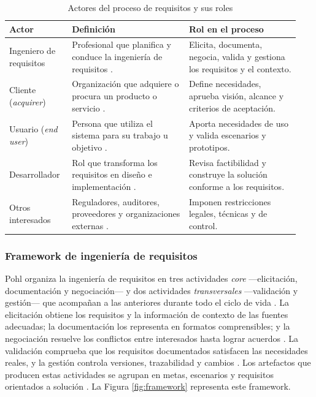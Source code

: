 \documentclass[onecolumn,12pt]{IEEEtran}
\begin{document}
\begin{table}[htbp]
\caption{Actores del proceso de requisitos y sus roles}
\label{tab:actores}
\centering
\footnotesize
\begin{tabular}{@{}p{0.20\linewidth}p{0.38\linewidth}p{0.36\linewidth}@{}}
\toprule
\textbf{Actor} & \textbf{Definici\'on} & \textbf{Rol en el proceso}\\
\midrule
Ingeniero de requisitos & Profesional que planifica y conduce la ingenier\'ia de requisitos \cite{pohl2025,ireb2023}. & Elicita, documenta, negocia, valida y gestiona los requisitos y el contexto.\\
Cliente (\emph{acquirer}) & Organizaci\'on que adquiere o procura un producto o servicio \cite{iso29148}. & Define necesidades, aprueba visi\'on, alcance y criterios de aceptaci\'on.\\
Usuario (\emph{end user}) & Persona que utiliza el sistema para su trabajo u objetivo \cite{iso29148}. & Aporta necesidades de uso y valida escenarios y prototipos.\\
Desarrollador & Rol que transforma los requisitos en dise\~no e implementaci\'on \cite{iso29148,pohl2025}. & Revisa factibilidad y construye la soluci\'on conforme a los requisitos.\\
Otros interesados & Reguladores, auditores, proveedores y organizaciones externas \cite{iso29148,pmbok7}. & Imponen restricciones legales, t\'ecnicas y de control.\\
\bottomrule
\end{tabular}
\end{table}

\subsubsection{Framework de ingenier\'ia de requisitos}
Pohl organiza la ingenier\'ia de requisitos en tres actividades \emph{core} ---elicitaci\'on, documentaci\'on y negociaci\'on--- y dos actividades \emph{transversales} ---validaci\'on y gesti\'on--- que acompa\~nan a las anteriores durante todo el ciclo de vida \cite{pohl2025}. La elicitaci\'on obtiene los requisitos y la informaci\'on de contexto de las fuentes adecuadas; la documentaci\'on los representa en formatos comprensibles; y la negociaci\'on resuelve los conflictos entre interesados hasta lograr acuerdos \cite{pohl2025}. La validaci\'on comprueba que los requisitos documentados satisfacen las necesidades reales, y la gesti\'on controla versiones, trazabilidad y cambios \cite{pohl2025,swebok4}. Los artefactos que producen estas actividades se agrupan en metas, escenarios y requisitos orientados a soluci\'on \cite{pohl2025}. La Figura \ref{fig:framework} representa este framework.
\end{document}
